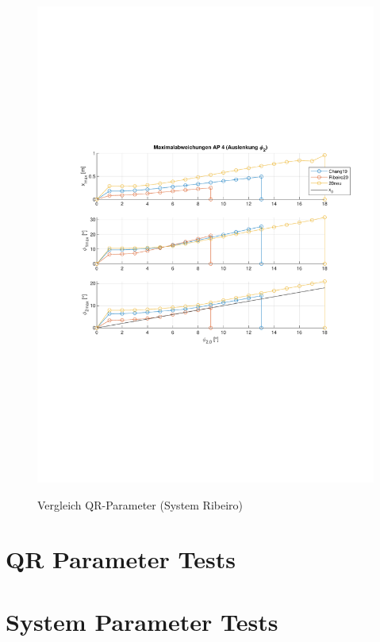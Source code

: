 \begin{figure}
\begin{minipage}[t]{0.45\linewidth}
		\includegraphics[scale=0.5]{Bilder/Parameter neu (Ribeiro) Creg off/AP42.pdf}
		\label{fig:ap3}
	 \end{minipage}
	\caption{Vergleich QR-Parameter (System Ribeiro)}
\end{figure}




\section{QR Parameter Tests}



\section{System Parameter Tests}



